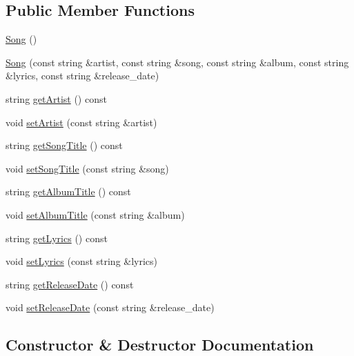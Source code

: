 \subsection*{Public Member Functions}
\begin{DoxyCompactItemize}
\item 
\mbox{\hyperlink{classbridges_1_1dataset_1_1_song_a6b7523787312a5b8d16b20b09ab59ea6}{Song}} ()
\item 
\mbox{\hyperlink{classbridges_1_1dataset_1_1_song_a0938ada0b5596c874aa9254f1bde1275}{Song}} (const string \&artist, const string \&song, const string \&album, const string \&lyrics, const string \&release\+\_\+date)
\item 
string \mbox{\hyperlink{classbridges_1_1dataset_1_1_song_a1d0ccb86300534ad221a36171e7b2e2b}{get\+Artist}} () const
\item 
void \mbox{\hyperlink{classbridges_1_1dataset_1_1_song_ab37a93674d0e4b219d24c14cfc2b0756}{set\+Artist}} (const string \&artist)
\item 
string \mbox{\hyperlink{classbridges_1_1dataset_1_1_song_a78d4dd02799751849d54b66208cc52a8}{get\+Song\+Title}} () const
\item 
void \mbox{\hyperlink{classbridges_1_1dataset_1_1_song_aa707a5a8905585643893b6c71bf5e299}{set\+Song\+Title}} (const string \&song)
\item 
string \mbox{\hyperlink{classbridges_1_1dataset_1_1_song_a0bc005c3522a1ac6c36bbf721014cb07}{get\+Album\+Title}} () const
\item 
void \mbox{\hyperlink{classbridges_1_1dataset_1_1_song_aab02dcdc8f5332ff18e5127210ba17dc}{set\+Album\+Title}} (const string \&album)
\item 
string \mbox{\hyperlink{classbridges_1_1dataset_1_1_song_a422252665dfb6eff87bef86726c5bc74}{get\+Lyrics}} () const
\item 
void \mbox{\hyperlink{classbridges_1_1dataset_1_1_song_a1ec794f19e791366b9af9df132d4a4b5}{set\+Lyrics}} (const string \&lyrics)
\item 
string \mbox{\hyperlink{classbridges_1_1dataset_1_1_song_aa4ffed01f8c77803e382ba2264fc91ee}{get\+Release\+Date}} () const
\item 
void \mbox{\hyperlink{classbridges_1_1dataset_1_1_song_ab40e43ae94ffc57d2f036769d807a144}{set\+Release\+Date}} (const string \&release\+\_\+date)
\end{DoxyCompactItemize}


\subsection{Constructor \& Destructor Documentation}
\mbox{\label{classbridges_1_1dataset_1_1_song_a6b7523787312a5b8d16b20b09ab59ea6}} 
